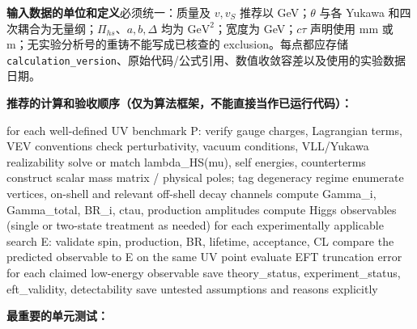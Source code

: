 \documentclass[
  chinese,
  UTF8]{ctexart}
\newenvironment{Shaded}{}{}
\newcommand{\NormalTok}[1]{#1}
\begin{document}
\textbf{输入数据的单位和定义}必须统一：质量及 \(v,v_S\) 推荐以
GeV；\(\theta\) 与各 Yukawa
和四次耦合为无量纲；\(\Pi_{hs}\)、\(a,b,\Delta\) 均为
\(\mathrm{GeV}^2\)；宽度为 GeV；\(c\tau\) 声明使用 mm 或
m；无实验分析号的重铸不能写成已核查的 exclusion。每点都应存储
\texttt{calculation\_version}、原始代码/公式引用、数值收敛容差以及使用的实验数据日期。

\textbf{推荐的计算和验收顺序（仅为算法框架，不能直接当作已运行代码）：}

\begin{Shaded}
\begin{Highlighting}[]
\NormalTok{for each well{-}defined UV benchmark P:}
\NormalTok{    verify gauge charges, Lagrangian terms, VEV conventions}
\NormalTok{    check perturbativity, vacuum conditions, VLL/Yukawa realizability}
\NormalTok{    solve or match lambda\_HS(mu), self energies, counterterms}
\NormalTok{    construct scalar mass matrix / physical poles; tag degeneracy regime}
\NormalTok{    enumerate vertices, on{-}shell and relevant off{-}shell decay channels}
\NormalTok{    compute Gamma\_i, Gamma\_total, BR\_i, ctau, production amplitudes}
\NormalTok{    compute Higgs observables (single or two{-}state treatment as needed)}
\NormalTok{    for each experimentally applicable search E:}
\NormalTok{        validate spin, production, BR, lifetime, acceptance, CL}
\NormalTok{        compare the predicted observable to E on the same UV point}
\NormalTok{    evaluate EFT truncation error for each claimed low{-}energy observable}
\NormalTok{    save theory\_status, experiment\_status, eft\_validity, detectability}
\NormalTok{    save untested assumptions and reasons explicitly}
\end{Highlighting}
\end{Shaded}

\textbf{最重要的单元测试：}
\end{document}
